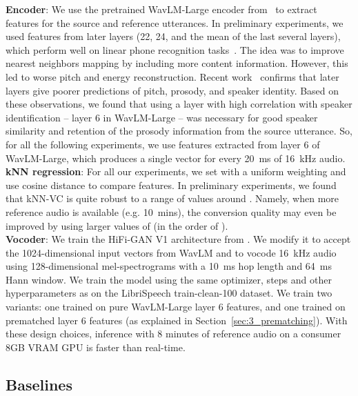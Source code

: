 \documentclass{INTERSPEECH2023}
\def\modelname{{kNN-VC}}
\begin{document}
\textbf{Encoder}: We use the pretrained WavLM-Large encoder from~\cite{chen2022wavlm} to extract features for the source and reference utterances.
In preliminary experiments, we used features from later layers (22, 24, and the mean of the last several layers), which perform well on linear phone recognition tasks~\cite{chen2022wavlm}.
The idea was to improve nearest neighbors mapping by including more content information.
However, this led to worse pitch and energy reconstruction.
Recent work~\cite{wavlm_prosody_weights2023} confirms that later layers
give poorer predictions of pitch, prosody, and speaker identity. Based on these observations, we found that using a layer with high correlation with speaker identification -- layer 6 in WavLM-Large -- was necessary for good speaker similarity and retention of the prosody information from the source utterance.
So, for all the following experiments, we use features extracted from layer 6 of WavLM-Large, which produces a single vector for every 20~ms of 16~kHz audio.\\

\noindent \textbf{kNN regression}: 
For all our experiments, we set  with a uniform weighting and use cosine distance to compare features.
In preliminary experiments, we found that \modelname{} is quite robust to a range of values around . 
Namely, when more reference audio is available (e.g. 10~mins), the conversion quality may even be improved by using larger values of  (in the order of ). \\

\noindent \textbf{Vocoder}: We train the HiFi-GAN V1 architecture from \cite{hifi-gan}.
We modify it
to accept the 1024-dimensional input vectors from WavLM and to vocode 16~kHz audio using 128-dimensional mel-spectrograms
with a 10~ms hop length and 64~ms Hann window.
We train the model using the same optimizer, steps and other hyperparameters as \cite{hifi-gan} on the LibriSpeech train-clean-100 dataset.
We train two
variants: one trained on pure WavLM-Large layer 6 features, and one trained on prematched layer 6 features (as explained in Section~\ref{sec:3_prematching}).
With these design choices, inference with 8 minutes of reference audio on a consumer 8GB VRAM GPU is faster than real-time.

\subsection{Baselines}
\end{document}
